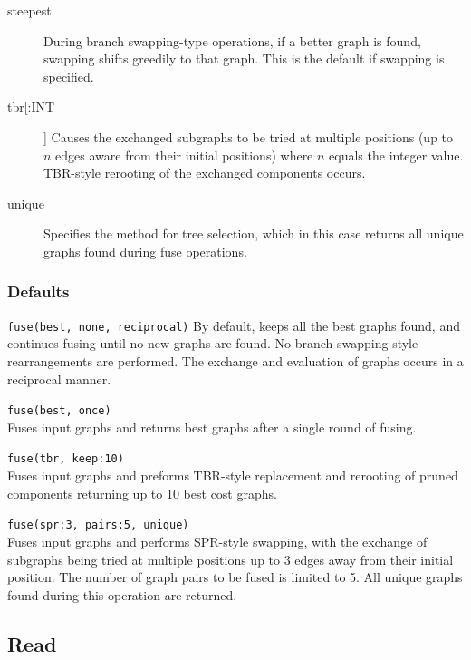 \begin{description}
		\item [steepest] During branch swapping-type operations, if a better graph is found, swapping 
		shifts greedily to that graph. This is the default if swapping is specified.
		
		\item [tbr[:INT]] Causes the exchanged subgraphs to be tried at multiple positions (up to 
		$n$ edges aware from their initial positions) where $n$ equals the integer value. TBR-style 
		rerooting of the exchanged components occurs.
		
		\item [unique] Specifies the method for tree selection, which in this case returns all unique 
		graphs found during fuse operations.	
	\end{description}	
	
	\subsubsection{Defaults}
		\texttt{fuse(best, none, reciprocal)} By default, \phyg keeps all the best graphs found, and 
		continues fusing until no new graphs are found. No branch swapping style rearrangements 
		are performed. The exchange and evaluation of graphs occurs in a reciprocal manner. 
			
	\begin{example}
		\item{\texttt{fuse(best, once)}\\Fuses input graphs and returns best graphs after a single round of 
		fusing.}
		
		\item{\texttt{fuse(tbr, keep:10)} \\Fuses input graphs and preforms TBR-style replacement and 
		rerooting of pruned components returning up to 10 best cost graphs.}
		
		\item{\texttt{fuse(spr:3, pairs:5, unique)} \\Fuses input graphs and performs SPR-style swapping, 
		with the exchange of subgraphs being tried at multiple positions up to 3 edges away from their 
		initial position. The number of graph pairs to be fused is limited to 5. All unique graphs found
		during this operation are returned.}
	\end{example}

\subsection{Read}
\label{subsec:read}
